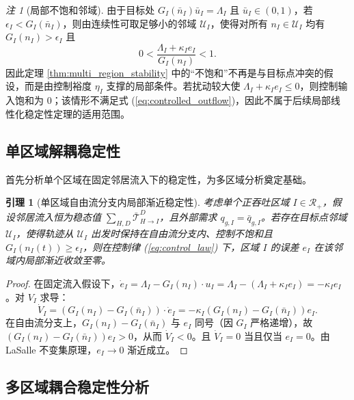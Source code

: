 \documentclass[a4paper,12pt]{article}
\theoremstyle{plain}
\newtheorem{lemma}[theorem]{引理}
\theoremstyle{definition}
\theoremstyle{remark}
\newtheorem{remark}[theorem]{注}
\begin{document}
\begin{remark}[局部不饱和邻域]\label{rem:unsaturated_neighborhood}
由于目标处 $G_I(\bar n_I)\bar u_I=\Lambda_I$ 且 $\bar u_I\in(0,1)$，若 $\epsilon_I<G_I(\bar n_I)$，则由连续性可取足够小的邻域 $\mathcal U_I$，使得对所有 $n_I\in\mathcal U_I$ 均有 $G_I(n_I)>\epsilon_I$ 且
\begin{equation}
    0<\frac{\Lambda_I+\kappa_I e_I}{G_I(n_I)}<1 .
\end{equation}
因此定理 \ref{thm:multi_region_stability} 中的“不饱和”不再是与目标点冲突的假设，而是由控制裕度 $\eta_I$ 支撑的局部条件。若扰动较大使 $\Lambda_I+\kappa_I e_I\le0$，则控制输入饱和为 $0$；该情形不满足式 (\ref{eq:controlled_outflow})，因此不属于后续局部线性化稳定性定理的适用范围。
\end{remark}

\subsection{单区域解耦稳定性}

首先分析单个区域在固定邻居流入下的稳定性，为多区域分析奠定基础。

\begin{lemma}[单区域自由流分支内局部渐近稳定性]\label{lem:single_region}
考虑单个正吞吐区域 $I\in\mathcal R_+$，假设邻居流入恒为稳态值 $\sum_{H,D} \bar{\mathcal{T}}_{H \to I}^D$，且外部需求 $q_{g,I} = \bar{q}_{g,I}$。若存在目标点邻域 $\mathcal U_I$，使得轨迹从 $\mathcal U_I$ 出发时保持在自由流分支内、控制不饱和且 $G_I(n_I(t))\ge\epsilon_I$，则在控制律 (\ref{eq:control_law}) 下，区域 $I$ 的误差 $e_I$ 在该邻域内局部渐近收敛至零。
\end{lemma}

\begin{proof}
在固定流入假设下，$\dot{e}_I = \Lambda_I - G_I(n_I) \cdot u_I = \Lambda_I - (\Lambda_I + \kappa_I e_I) = -\kappa_I e_I$。对 $V_I$ 求导：
\begin{equation}
    \dot{V}_I = (G_I(n_I) - G_I(\bar{n}_I)) \cdot \dot{e}_I
    =
    -\kappa_I\left(G_I(n_I)-G_I(\bar n_I)\right)e_I .
\end{equation}
在自由流分支上，$G_I(n_I)-G_I(\bar n_I)$ 与 $e_I$ 同号（因 $G_I$ 严格递增），故 $\left(G_I(n_I)-G_I(\bar n_I)\right)e_I>0$，从而 $\dot{V}_I<0$。且 $\dot{V}_I = 0$ 当且仅当 $e_I = 0$。由 LaSalle 不变集原理，$e_I \to 0$ 渐近成立。
\end{proof}

\subsection{多区域耦合稳定性分析}
\end{document}
